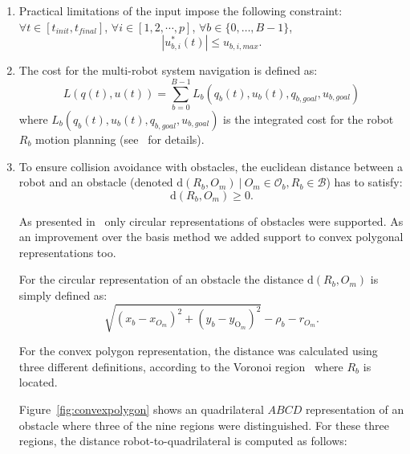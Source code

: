 \begin{enumerate}
    \item Practical limitations of the input impose
    the following constraint: $\forall t \in [t_{init}, t_{final}]$, $\forall i \in [1,2,\cdots, p]$, $\forall b \in \{0,\dots,B-1\}$,
    \begin{equation}
        |u^{*}_{b,i}(t)| \leq u_{b,i,max}.
    \end{equation}
    
    \item The cost for the multi-robot system navigation is defined as:
    \begin{equation}
        L(q(t),u(t)) = \sum_{b=0}^{B-1}L_b(q_b(t), u_b(t), q_{b,goal},u_{b,goal})
    \end{equation}
    where $L_b(q_b(t), u_b(t), q_{b,goal},u_{b,goal})$ is the 
    integrated cost for the robot $R_b$
    motion planning (see~\cite{Defoort2009} for details).
    
    \item 
    To ensure collision avoidance with obstacles, the euclidean 
    distance between
    a robot and an obstacle (denoted $\mathrm{d}(R_b, O_m)\ |\ O_m
    \in \mathcal{O}_b, R_b \in \mathcal{B} $) has to satisfy:
    \begin{equation}
    	\mathrm{d}(R_b, O_m) \geq 0.
    \end{equation}
    
	As presented in~\cite{Defoort2007a, Defoort2009} only circular representations of obstacles were supported. As an improvement over the basis method we added support to convex polygonal representations too.
    
    For the circular representation of an obstacle the distance
    $\mathrm{d}(R_b, O_m)$ is simply defined as:
    \begin{equation*}
        \sqrt{(x_{b} - x_{O_m})^2 + (y_{b} - y_{\mathrm{O}_m})^2}  - \rho_b - r_{O_m}.
    \end{equation*}
    
    For the convex polygon representation, the distance was calculated
    using three different
    definitions, according to the Voronoi region~\cite{ericson2004real}
    where $R_b$ is located.
    
    Figure~\ref{fig:convexpolygon} shows an
    quadrilateral $ABCD$ representation of an obstacle where three of the nine
    regions were distinguished. For these three regions, the distance
    robot-to-quadrilateral is computed as follows:
    \begin{enumerate}
    

\end{enumerate}
\end{enumerate}
